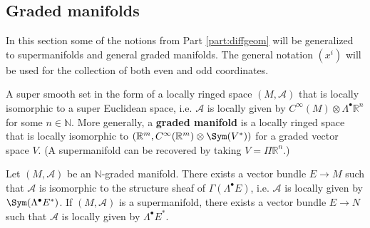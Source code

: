 \subsection{Graded manifolds}

    In this section some of the notions from Part \ref{part:diffgeom} will be generalized to supermanifolds and general graded manifolds. The general notation $(x^i)$ will be used for the collection of both even and odd coordinates.

    \begin{example}[Supermanifold]
        A super smooth set in the form of a locally ringed space $(M,\mathcal{A})$ that is locally isomorphic to a super Euclidean space, i.e. $\mathcal{A}$ is locally given by $C^\infty(M)\otimes\Lambda^\bullet\mathbb{R}^n$ for some $n\in\mathbb{N}$. More generally, a \textbf{graded manifold} is a locally ringed space that is locally isomorphic to $(\mathbb{R}^m, C^\infty(\mathbb{R}^m)\otimes\Sym(V^*))$ for a graded vector space $V$. (A supermanifold can be recovered by taking $V=\Pi\mathbb{R}^n$.)
    \end{example}

    \begin{theorem}[Batchelor]
        Let $(M,\mathcal{A})$ be an $\mathbb{N}$-graded manifold. There exists a vector bundle $E\rightarrow M$ such that $\mathcal{A}$ is isomorphic to the structure sheaf of $\Gamma(\Lambda^\bullet E)$, i.e. $\mathcal{A}$ is locally given by $\Sym(\Lambda^\bullet E^*)$. If $(M,\mathcal{A})$ is a supermanifold, there exists a vector bundle $E\rightarrow N$ such that $\mathcal{A}$ is locally given by $\Lambda^\bullet E^*$.
    \end{theorem}


